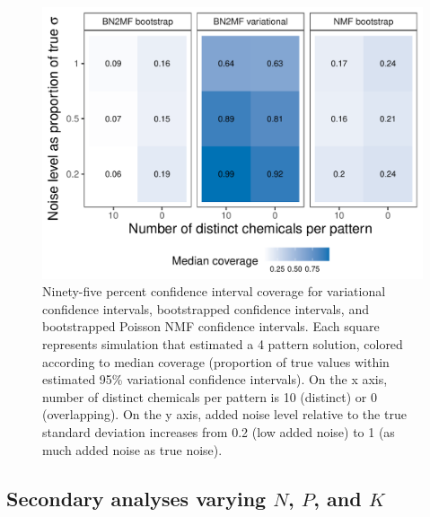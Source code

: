 {\clearpage
\begin{figure}
\caption[Comparison of variational and bootstrapped coverage]{Ninety-five percent confidence interval coverage for variational confidence intervals, bootstrapped \bnmf confidence intervals, and bootstrapped Poisson NMF confidence intervals. Each square represents simulation that estimated a 4 pattern solution, colored according to median coverage (proportion of true values within estimated 95\% variational confidence intervals). On the x axis, number of distinct chemicals per pattern is 10 (distinct) or 0 (overlapping). On the y axis, added noise level relative to the true standard deviation increases from 0.2 (low added noise) to 1 (as much added noise as true noise).}
\label{fig:boot_coverage}
\centering
\includegraphics[scale = 0.7]{./figures/bootstrap_coverage.pdf}
\end{figure}

\clearpage
\subsection{Secondary analyses varying $N$, $P$, and $K$}
}
